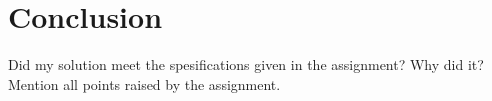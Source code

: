 \chapter{Conclusion}
Did my solution meet the spesifications given in the assignment? Why did it? Mention all points raised by the assignment.